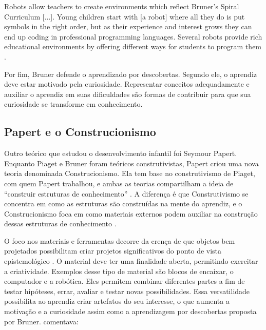 \begin{citacao}
Robots allow teachers to create environments which reflect Bruner’s Spiral Curriculum [...]. Young children start with [a robot] where all they do is put symbols in the right order, but as their experience and interest grows they can end up coding in professional programming languages. Several robots provide rich educational environments by offering different ways for students to program them \cite{catlin_edurobots_2018}. 
\end{citacao}


Por fim, Bruner defende o aprendizado por descobertas. Segundo ele, o aprendiz deve estar motivado pela curiosidade. Representar conceitos adequadamente e auxiliar o aprendiz em suas dificuldades são formas de contribuir para que sua curiosidade se transforme em conhecimento.

\subsection{Papert e o Construcionismo}

Outro teórico que estudou o desenvolvimento infantil foi Seymour Papert. Enquanto Piaget e Bruner foram teóricos construtivistas, Papert criou uma nova teoria denominada Construcionismo. Ela tem base no construtivismo de Piaget, com quem Papert trabalhou, e ambas as teorias compartilham a ideia de “construir estruturas de conhecimento” \cite{papert_situating_1991}. A diferença é que Construtivismo se concentra em como as estruturas são construídas na mente do aprendiz, e o Construcionismo foca em como materiais externos podem auxiliar na construção dessas estruturas de conhecimento \cite{bers_blocks_2008}.

O foco nos materiais e ferramentas decorre da crença de que objetos bem projetados possibilitam criar projetos significativos do ponto de vista epistemológico \cite{bers_blocks_2008}. O material deve ter uma finalidade aberta, permitindo exercitar a criatividade. Exemplos desse tipo de material são blocos de encaixar, o computador e a robótica. Eles permitem combinar diferentes partes a fim de testar hipóteses, errar, avaliar e testar novas possibilidades. Essa versatilidade possibilita ao aprendiz criar artefatos do seu interesse, o que aumenta a motivação e a curiosidade assim como a aprendizagem por descobertas proposta por Bruner.  comentava:

